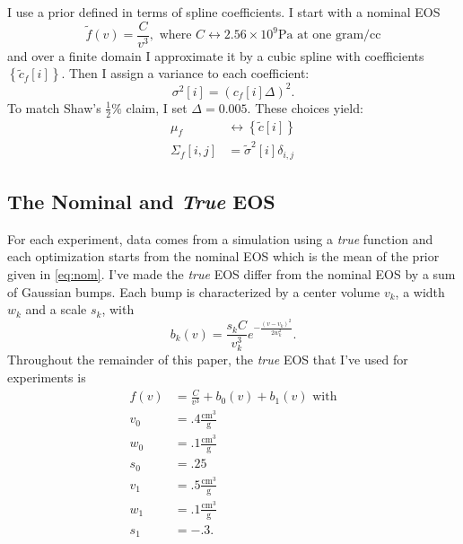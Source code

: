 \documentclass[11pt]{article}
\newcommand\vol{v}        %
\newcommand{\eos}{f}
\newcommand{\eosnom}{\tilde f}
\newcommand\cf{c_f}
\begin{document}
I use a prior defined in terms of spline coefficients.  I start with a
nominal EOS
\begin{equation}
  \label{eq:nom}
  \eosnom(\vol) = \frac{C}{\vol^3}, \text{ where } C \leftrightarrow
  2.56\times10^9 \text{Pa} \text{ at one gram/cc}
\end{equation}
and over a finite domain I approximate it by a cubic spline with
coefficients $\left\{\tilde \cf[i] \right\}$.  Then I assign a variance to
  each coefficient:
\begin{equation}
  \label{eq:3}
  \sigma^2[i] = \left( \cf[i] \Delta \right)^2.
\end{equation}
To match Shaw's $\frac{1}{2} \%$ claim, I set $\Delta = 0.005$.  These
choices yield:
\begin{align*}
  \mu_\eos &\leftrightarrow \left\{\tilde c[i] \right\} \\
  \Sigma_\eos[i,j] &= \tilde \sigma^2[i] \delta_{i,j}
\end{align*}

\subsection{The Nominal and \emph{True} EOS}
\label{sec:true-eos}

For each experiment, data comes from a simulation using a \emph{true}
function and each optimization starts from the nominal EOS which is
the mean of the prior given in \eqref{eq:nom}.  I've made the
\emph{true} EOS differ from the nominal EOS by a sum of Gaussian
bumps.  Each bump is characterized by a center volume $v_k$, a width
$w_k$ and a scale $s_k$, with
\begin{equation*}
  b_k(v) = \frac{s_k C}{v_k^3} e^{- \frac{(v-v_k)^2}{2w_k^2}}.
\end{equation*}
Throughout the remainder of this paper, the \emph{true} EOS that I've
used for experiments is
\begin{align}
  \label{eq:actual}
  f(v) &= \frac{C}{v^3} + b_0(v) + b_1(v) \text{ with} \\
  v_0 &= .4 \frac{\text{cm}^3}{\text{g}} \nonumber \\
  w_0 &= .1 \frac{\text{cm}^3}{\text{g}} \nonumber \\
  s_0 &= .25 \nonumber \\
  v_1 &= .5 \frac{\text{cm}^3}{\text{g}} \nonumber \\
  w_1 &= .1 \frac{\text{cm}^3}{\text{g}} \nonumber \\
  s_1 &= -.3 \nonumber.
\end{align}
\end{document}
